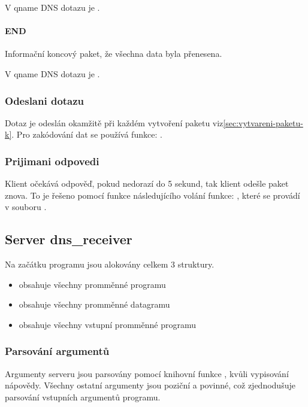 V qname DNS dotazu je .

\paragraph{END}
Informační koncový paket, že všechna data byla přenesena.

V qname DNS dotazu je .

\subsubsection{Odeslani dotazu} \label{sec:odeslani-dotazu-k}
Dotaz je odeslán okamžitě při každém vytvoření paketu viz\ref{sec:vytvareni-paketu-k}.
Pro zakódování dat se používá funkce:
\cite{encodingData}.

\subsubsection{Prijimani odpovedi}\label{sec:prijimani-odpovedi-k}
Klient očekává odpověď, pokud nedorazí do 5 sekund, tak klient
odešle paket znova.
To je řešeno pomocí funkce následujícího volání funkce:
,
které se provádí v souboru .



\subsection{Server \- dns\_receiver}

Na začátku programu jsou alokovány celkem 3 struktury.

\begin{itemize}
    \item {} \- obsahuje všechny promměnné programu
    \item {} \- obsahuje všechny promměnné datagramu
    \item {} \- obsahuje všechny vstupní promměnné programu
\end{itemize}

\subsubsection{Parsování argumentů} \label{sec:parsovani-argumentu-s}
Argumenty serveru jsou parsovány pomocí knihovní funkce ,
kvůli
vypisování nápovědy. Všechny ostatní argumenty jsou poziční a povinné,
což zjednodušuje parsování vstupních argumentů programu.

